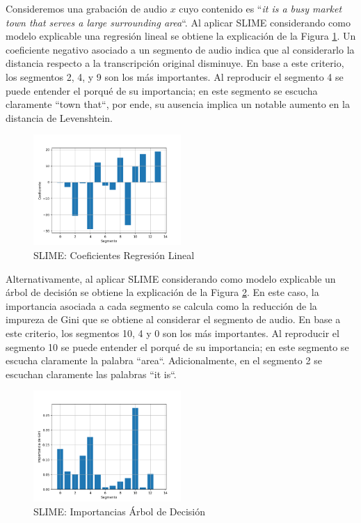 \documentclass[conference]{IEEEtran}
\begin{document}
Consideremos una grabación de audio $x$ cuyo contenido es ``\textit{it is a busy market town that serves a large surrounding area}``. Al aplicar SLIME considerando como modelo explicable una regresión lineal se obtiene la explicación de la Figura \ref{fig:coefficients}. Un coeficiente negativo asociado a un segmento de audio indica que al considerarlo la distancia respecto a la transcripción original disminuye. En base a este criterio, los segmentos 2, 4, y 9 son los más importantes. Al reproducir el segmento 4 se puede entender el porqué de su importancia; en este segmento se escucha claramente ``town that``, por ende, su ausencia implica un notable aumento en la distancia de Levenshtein.

\begin{figure}[ht]
\centerline{\includegraphics[width=0.5\textwidth]{./images/coefficients.png}}
\caption{SLIME: Coeficientes Regresión Lineal}
\label{fig:coefficients}
\end{figure}

Alternativamente, al aplicar SLIME considerando como modelo explicable un árbol de decisión se obtiene la explicación de la Figura \ref{fig:gini}. En este caso, la importancia asociada a cada segmento se calcula como la reducción de la impureza de Gini que se obtiene al considerar el segmento de audio. En base a este criterio, los segmentos 10, 4 y 0 son los más importantes. Al reproducir el segmento 10 se puede entender el porqué de su importancia; en este segmento se escucha claramente la palabra ``area``. Adicionalmente, en el segmento 2 se escuchan claramente las palabras ``it is``.

\begin{figure}[ht]
\centerline{\includegraphics[width=0.5\textwidth]{./images/gini.png}}
\caption{SLIME: Importancias Árbol de Decisión}
\label{fig:gini}
\end{figure}
\end{document}

